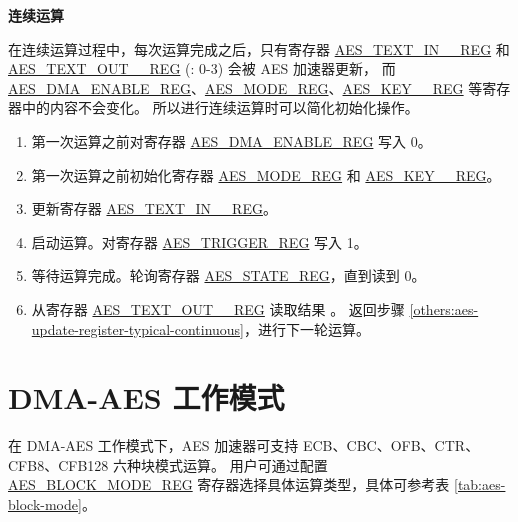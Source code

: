 \documentclass[main\_\_CN.tex]{subfiles}
\begin{document}
\textbf{连续运算}

在连续运算过程中，每次运算完成之后，只有寄存器 \hyperref[regdesc:AESTEXTINnREG]{AES\_TEXT\_IN\_\_REG} 和 \hyperref[regdesc:AESTEXTOUTnREG]{AES\_TEXT\_OUT\_\_REG} (: 0-3) 会被 AES 加速器更新，
而 \hyperref[regdesc:AESDMAENABLEREG]{AES\_DMA\_ENABLE\_REG}、\hyperref[regdesc:AESMODEREG]{AES\_MODE\_REG}、\hyperref[regdesc:AESKEYnREG]{AES\_KEY\_\_REG} 等寄存器中的内容不会变化。
所以进行连续运算时可以简化初始化操作。

\begin{enumerate}
    \item 第一次运算之前对寄存器 \hyperref[regdesc:AESDMAENABLEREG]{AES\_DMA\_ENABLE\_REG} 写入 0。
    \item 第一次运算之前初始化寄存器 \hyperref[regdesc:AESMODEREG]{AES\_MODE\_REG} 和 \hyperref[regdesc:AESKEYnREG]{AES\_KEY\_\_REG}。
    \item 更新寄存器 \hyperref[regdesc:AESTEXTINnREG]{AES\_TEXT\_IN\_\_REG}。 \label{others:aes-update-register-typical-continuous}
    \item 启动运算。对寄存器 \hyperref[regdesc:AESTRIGGERREG]{AES\_TRIGGER\_REG} 写入 1。
    \item 等待运算完成。轮询寄存器 \hyperref[regdesc:AESSTATEREG]{AES\_STATE\_REG}，直到读到 0。
    \item 从寄存器 \hyperref[regdesc:AESTEXTOUTnREG]{AES\_TEXT\_OUT\_\_REG} 读取结果 \label{read result in typical AES continuous calculation}。 返回步骤 \ref{others:aes-update-register-typical-continuous}，进行下一轮运算。
\end{enumerate}


\section{DMA-AES 工作模式}\label{sec:aes-dma-aes}

在 DMA-AES 工作模式下，AES 加速器可支持 ECB、CBC、OFB、CTR、CFB8、CFB128 六种块模式运算。
用户可通过配置 \hyperref[regdesc:AESBLOCKMODEREG]{AES\_BLOCK\_MODE\_REG} 寄存器选择具体运算类型，具体可参考表 \ref{tab:aes-block-mode}。
\end{document}

